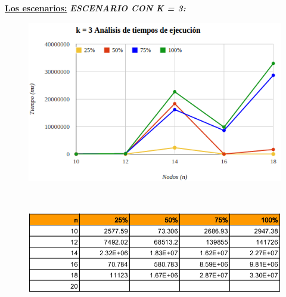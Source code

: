 \documentclass[10pt,a4paper]{article}
\begin{document}
\underline{\textbf{Los escenarios:}}
\textbf{\textit{ESCENARIO CON K = 3:}}
	\begin{figure}[h]
		\begin{center}
		   \includegraphics[scale=0.70]{graficos/k3.png}
		\end{center}
	\end{figure}\\
	\begin{figure}[h]
		\begin{center}
		   \includegraphics[scale=0.50]{graficos/tablak3.png}
		\end{center}
	\end{figure}\\
\end{document}
